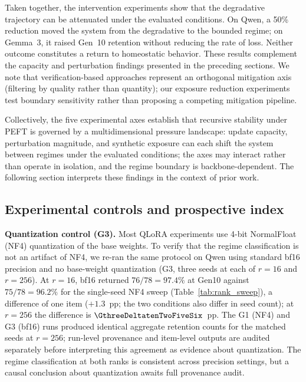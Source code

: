 \documentclass[a4paper,fleqn]{cas-dc}
\newif\ifshowchanges
\newcommand{\rev}[1]{\ifshowchanges{\color{blue}#1}\else{#1}\fi}
\begin{document}
Taken together, the intervention experiments show that the 
\rev{degradative trajectory can be attenuated under the evaluated 
conditions. On Qwen, a 50\% reduction moved the system from the degradative to the bounded regime; on Gemma~3, it raised Gen~10 retention without reducing the rate of loss. Neither outcome constitutes a return to homeostatic behavior.} These results complement the capacity and perturbation findings presented in the preceding sections. We note
that verification-based approaches \citep{yi2025} represent an orthogonal
mitigation axis (filtering by quality rather than quantity); our exposure
reduction experiments test boundary sensitivity rather than proposing a
competing mitigation pipeline.

Collectively, the five experimental axes establish that recursive stability
under PEFT is governed by a multidimensional pressure landscape: update
capacity, perturbation magnitude, and synthetic exposure \rev{can each shift} the system between regimes under the evaluated conditions; the axes may interact rather than operate in isolation, and the regime boundary is backbone-dependent. The following section
interprets these findings in the context of prior work.

\subsection{Experimental controls and prospective index}\label{sec:res_controls}

\rev{\textbf{Quantization control (G3).}
Most QLoRA experiments use 4-bit NormalFloat (NF4) quantization of the base
weights. To verify that the regime classification is not an artifact of NF4, we
re-ran the same protocol on Qwen using standard bf16 precision and no base-weight
quantization (G3, three seeds at each of $r=16$ and $r=256$). At $r=16$, bf16 returned $76/78 = 97.4\%$ at Gen10 against $75/78 = 96.2\%$ for
the single-seed NF4 sweep (Table~\ref{tab:rank_sweep}), a difference of one item ($+1.3$~pp; the two conditions also differ in seed count); at $r=256$ the difference is $\GthreeDeltatenTwoFiveSix$~pp.
The G1 (NF4) and G3 (bf16) runs produced identical aggregate retention counts
for the matched seeds at $r=256$; run-level provenance and item-level outputs
are audited separately before interpreting this agreement as evidence about
quantization. The regime classification at both ranks is consistent across
precision settings, but a causal conclusion about quantization awaits full
provenance audit.}
\end{document}
